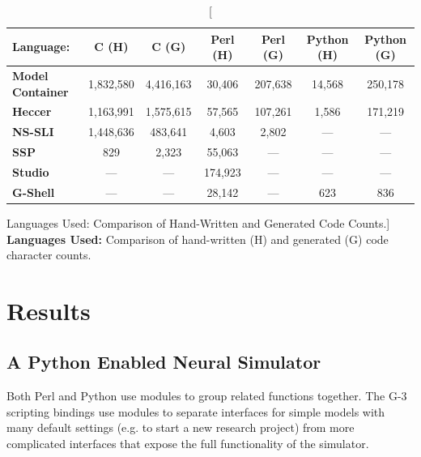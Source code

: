 \documentclass[12pt]{article}
\begin{document}
\begin{table}[h]
  \centering
  \begin{tabular}{|l|c|c|c|c|c|c|}
    \hline

    \rule[-2ex]{0mm}{5ex}
    {\bf Language:}
    & {\bf C (H)}
    & {\bf C (G)}
    & {\bf Perl (H)}
    & {\bf Perl (G)}
    & {\bf Python (H)}
    & {\bf Python (G)} \\

    \hline

    \rule[-2ex]{0mm}{5ex}
    {\bf Model\,Container}
    & 1,832,580
    & 4,416,163
    & 30,406
    & 207,638
    & 14,568
    & 250,178 \\

    \rule[-2ex]{0mm}{5ex}
    {\bf Heccer}
    & 1,163,991
    & 1,575,615
    & 57,565
    & 107,261
    & 1,586
    & 171,219 \\

    \rule[-2ex]{0mm}{5ex}
    {\bf NS-SLI}
    & 1,448,636
    & 483,641
    & 4,603
    & 2,802
    & ---
    & --- \\

    \rule[-2ex]{0mm}{5ex}
    {\bf SSP}
    & 829
    & 2,323
    & 55,063
    & ---
    & ---
    & --- \\

    \rule[-2ex]{0mm}{5ex}
    {\bf Studio}
    & ---
    & ---
    & 174,923
    & ---
    & ---
    & --- \\

    \rule[-2ex]{0mm}{5ex}
    {\bf G-Shell}
    & ---
    & ---
    & 28,142
    & ---
    & 623
    & 836 \\

    \hline
  \end{tabular}
  \caption
  [Languages Used: Comparison of Hand-Written and Generated Code Counts.]
  {
    {\bf Languages Used:} Comparison of hand-written (H) and generated (G)  code character counts.
  }
  \label{tab:cbi-codecounts}
\end{table}


\section{Results}

\subsection{A Python Enabled Neural Simulator}
\label{ss-apens}

Both Perl and Python use modules to group related functions together.
The G-3 scripting bindings use modules to separate interfaces for
simple models with many default settings (e.g. to start a new research
project) from more complicated interfaces that expose the full
functionality of the simulator.
\end{document}
